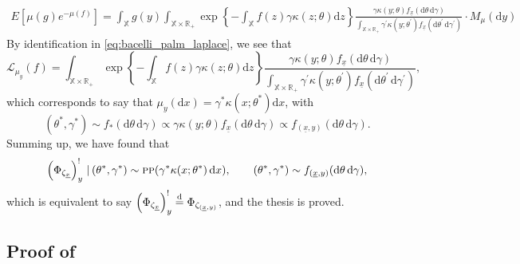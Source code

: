 \documentclass[11pt,a4paper,oneside]{article}
\newcommand{\deq}{\stackrel{\mbox{\scriptsize d}}{=}}
\newcommand{\dd}{\mathrm d}
\newcommand{\E}{E}
\newcommand{\X}{\mathbb{X}}
\newcommand{\R}{\mathbb{R}}
\renewcommand{\mid}{\ensuremath{\,|\,}}
\theoremstyle{definition}
\theoremstyle{remark}
\begin{document}
\begin{equation*}
    \begin{aligned}
         \E\left[ \mu(g) e^{-\mu(f)} \right] = \int_{\X} g(y)  \int_{\X\times \R_+}  \exp\left\{ - \int_{\X} f(z) \gamma \kappa(z; \theta) \dd z  \right\} \frac{\gamma \kappa(y; \theta)  f_{\underline{x}}(\dd\theta \, \dd \gamma)}{\int_{\X\times \R_+} \gamma^\prime \kappa(y; \theta^\prime) f_{\underline{x}}(\dd\theta^\prime\, \dd \gamma^\prime)} \cdot  M_\mu(\dd y)
    \end{aligned}
\end{equation*}
By identification in \eqref{eq:bacelli_palm_laplace}, we see that
\begin{equation*}
        \mathcal{L}_{\mu_y}(f) = \int_{\X\times \R_+}  \exp\left\{ - \int_{\X} f(z) \gamma \kappa(z; \theta) \dd z  \right\} \frac{\gamma \kappa(y; \theta)  f_{\underline{x}}(\dd\theta \, \dd \gamma)}{\int_{\X\times \R_+} \gamma^\prime \kappa(y; \theta^\prime) f_{\underline{x}}(\dd\theta^\prime\, \dd \gamma^\prime)},
\end{equation*}
which corresponds to say that $\mu_y(\dd x) = \gamma^* \kappa(x; \theta^*) \dd x$, with 
\[
( \theta^*, \gamma^*) \sim f_*(\dd \theta\,\dd \gamma) \propto \gamma \kappa(y; \theta)  f_{\underline{x}}(\dd\theta \, \dd \gamma) \propto f_{(\underline{x}, y)}(\dd\theta \, \dd \gamma).
\]
Summing up, we have found that 
\[
\left(\Phi_{\zeta_{{\underline{x}}}}\right)^!_y \mid (\theta^*, \gamma^*) \sim \textsc{pp}(\gamma^* \kappa(x; \theta^*) \,\dd x), \qquad (\theta^*, \gamma^*) \sim f_{(\underline{x}, y)}(\dd\theta \, \dd \gamma),
\]
which is equivalent to say $\left(\Phi_{\zeta_{{\underline{x}}}}\right)^!_y \deq \Phi_{\zeta_{({\underline{x}}, y)}}$, and the thesis is proved.


\subsection*{Proof of }
\end{document}
